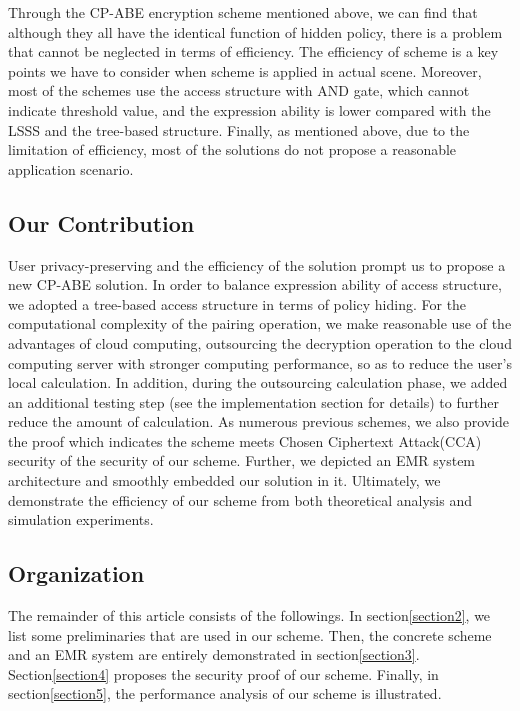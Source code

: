 \documentclass[smallextended]{svjour3}       %
\begin{document}
	Through the CP-ABE encryption scheme mentioned above, we can find that although they all have the identical function of hidden policy, there is a problem that cannot be neglected in terms of efficiency. 
	The efficiency of scheme is a key points we have to consider when scheme is applied in actual scene. 
	Moreover, most of the schemes use the access structure with AND gate, which cannot indicate threshold value, and the expression ability is lower compared with the LSSS and the tree-based structure. 
	Finally, as mentioned above, due to the limitation of efficiency, most of the solutions do not propose a reasonable application scenario.

\subsection{Our Contribution}
	User privacy-preserving and the efficiency of the solution prompt us to propose a new CP-ABE solution. %
	In order to balance expression ability of access structure, we adopted a tree-based access structure in terms of policy hiding. 
	For the computational complexity of the pairing operation, we make reasonable use of the advantages of cloud computing, outsourcing the decryption operation to the cloud computing server with stronger computing performance, so as to reduce the user's local calculation. 
	In addition, during the outsourcing calculation phase, we added an additional testing step (see the implementation section for details) to further reduce the amount of calculation. 
	As numerous previous schemes, we also provide the proof which indicates the scheme meets Chosen Ciphertext Attack(CCA) security of the security of our scheme. 
	Further, we depicted an EMR system architecture and smoothly embedded our solution in it. 
	Ultimately, we demonstrate the efficiency of our scheme from both theoretical analysis and simulation experiments.

\subsection{Organization}
	The remainder of this article consists of the followings. 
	In section\ref{section2}, we list some preliminaries that are used in our scheme. 
	Then, the concrete scheme and an EMR system are entirely demonstrated in section\ref{section3}. 
	Section\ref{section4} proposes the security proof of our scheme. Finally, in section\ref{section5}, the performance analysis of our scheme is illustrated.
\end{document}
